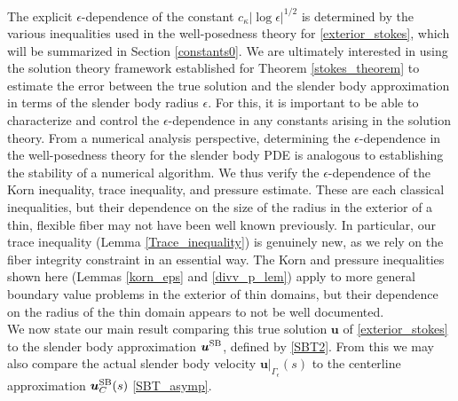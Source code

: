 \documentclass[11pt]{article}
\numberwithin{equation}{section}
\newcommand{\bu}{\bm{u}}
\newcommand{\SB}{{\rm SB}}
\theoremstyle{definition}
\begin{document}
The explicit $\epsilon$-dependence of the constant $c_{\kappa}|\log\epsilon|^{1/2}$ is determined by the various inequalities used in the well-posedness theory for \eqref{exterior_stokes}, which will be summarized in Section \ref{constants0}. We are ultimately interested in using the solution theory framework established for Theorem \ref{stokes_theorem} to estimate the error between the true solution and the slender body approximation in terms of the slender body radius $\epsilon$. For this, it is important to be able to characterize and control the $\epsilon$-dependence in any constants arising in the solution theory. From a numerical analysis perspective, determining the $\epsilon$-dependence in the well-posedness theory for the slender body PDE is analogous to establishing the stability of a numerical algorithm. We thus verify the $\epsilon$-dependence of the Korn inequality, trace inequality, and pressure estimate. These are each classical inequalities, but their dependence on the size of the radius in the exterior of a thin, flexible fiber may not have been well known previously. In particular, our trace inequality (Lemma \ref{Trace_inequality}) is genuinely new, as we rely on the fiber integrity constraint in an essential way. The Korn and pressure inequalities shown here (Lemmas \ref{korn_eps} and \ref{divv_p_lem}) apply to more general boundary value problems in the exterior of thin domains, but their dependence on the radius of the thin domain appears to not be well documented. \\

We now state our main result comparing this true solution $\bu$ of \eqref{exterior_stokes} to the slender body approximation $\bu^{\SB}$, defined by \eqref{SBT2}. From this we may also compare the actual slender body velocity $\bu\big|_{\Gamma_\epsilon}(s)$ to the centerline approximation $\bu^{\SB}_C(s)$ \eqref{SBT_asymp}.
\end{document}
